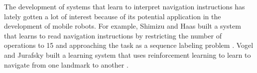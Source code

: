The development of systems that learn to interpret navigation instructions has lately gotten a lot of interest because of its potential application in the development of mobile robots. For example, Shimizu and Haas built a system that learns to read navigation instructions by restricting the number of operations to 15 and approaching the task as a sequence labeling problem \cite{shimizu2009learning}. Vogel and Jurafsky built a learning system that uses reinforcement learning to learn to navigate from one landmark to another \cite{vogel2010learning}.
